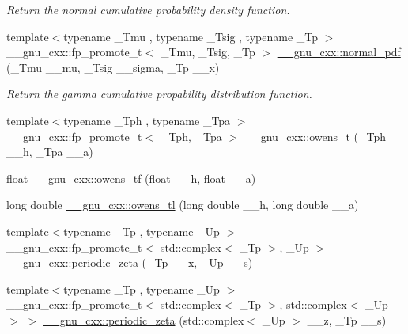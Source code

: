 \begin{DoxyCompactItemize}
\begin{DoxyCompactList}\small\item\em Return the normal cumulative probability density function. \end{DoxyCompactList}\item 
{\footnotesize template$<$typename \+\_\+\+Tmu , typename \+\_\+\+Tsig , typename \+\_\+\+Tp $>$ }\\\+\_\+\+\_\+gnu\+\_\+cxx\+::fp\+\_\+promote\+\_\+t$<$ \+\_\+\+Tmu, \+\_\+\+Tsig, \+\_\+\+Tp $>$ \hyperlink{group__mathsf__gnu_gab795379781dea732cbc7556351760401}{\+\_\+\+\_\+gnu\+\_\+cxx\+::normal\+\_\+pdf} (\+\_\+\+Tmu \+\_\+\+\_\+mu, \+\_\+\+Tsig \+\_\+\+\_\+sigma, \+\_\+\+Tp \+\_\+\+\_\+x)
\begin{DoxyCompactList}\small\item\em Return the gamma cumulative propability distribution function. \end{DoxyCompactList}\item 
{\footnotesize template$<$typename \+\_\+\+Tph , typename \+\_\+\+Tpa $>$ }\\\+\_\+\+\_\+gnu\+\_\+cxx\+::fp\+\_\+promote\+\_\+t$<$ \+\_\+\+Tph, \+\_\+\+Tpa $>$ \hyperlink{group__mathsf__gnu_gab4e367aae19853cca3af99eead01fcaa}{\+\_\+\+\_\+gnu\+\_\+cxx\+::owens\+\_\+t} (\+\_\+\+Tph \+\_\+\+\_\+h, \+\_\+\+Tpa \+\_\+\+\_\+a)
\item 
float \hyperlink{group__mathsf__gnu_gac24d32e9b072c4953654d5559f992871}{\+\_\+\+\_\+gnu\+\_\+cxx\+::owens\+\_\+tf} (float \+\_\+\+\_\+h, float \+\_\+\+\_\+a)
\item 
long double \hyperlink{group__mathsf__gnu_ga7a8bc60dc0ef4a009586872eb7cac2d0}{\+\_\+\+\_\+gnu\+\_\+cxx\+::owens\+\_\+tl} (long double \+\_\+\+\_\+h, long double \+\_\+\+\_\+a)
\item 
{\footnotesize template$<$typename \+\_\+\+Tp , typename \+\_\+\+Up $>$ }\\\+\_\+\+\_\+gnu\+\_\+cxx\+::fp\+\_\+promote\+\_\+t$<$ std\+::complex$<$ \+\_\+\+Tp $>$, \+\_\+\+Up $>$ \hyperlink{group__mathsf__gnu_ga06b06216e87b868cb21c76d33ac560c8}{\+\_\+\+\_\+gnu\+\_\+cxx\+::periodic\+\_\+zeta} (\+\_\+\+Tp \+\_\+\+\_\+x, \+\_\+\+Up \+\_\+\+\_\+s)
\item 
{\footnotesize template$<$typename \+\_\+\+Tp , typename \+\_\+\+Up $>$ }\\\+\_\+\+\_\+gnu\+\_\+cxx\+::fp\+\_\+promote\+\_\+t$<$ std\+::complex$<$ \+\_\+\+Tp $>$, std\+::complex$<$ \+\_\+\+Up $>$ $>$ \hyperlink{group__mathsf__gnu_gaf3704ce510319b5c4c5cedd55dfaa42f}{\+\_\+\+\_\+gnu\+\_\+cxx\+::periodic\+\_\+zeta} (std\+::complex$<$ \+\_\+\+Up $>$ \+\_\+\+\_\+z, \+\_\+\+Tp \+\_\+\+\_\+s)

\end{DoxyCompactItemize}
